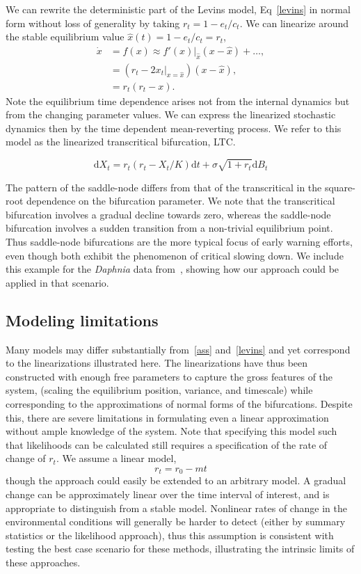 \documentclass[authoryear, preprint,review,12pt]{elsarticle}
\newcommand{\ud}{\mathrm{d}}
\begin{document}
We can rewrite the deterministic part of the Levins model, Eq~\ref{levins} in normal form without loss of generality by taking $r_t = 1 - e_t/c_t$.  
We can linearize around the stable equilibrium value $\hat x(t) = 1 - e_t/c_t = r_t$, 
\begin{align}
\dot x &=  f(x) \approx f'(x)|_{\hat x} (x - \hat x) + \ldots, \nonumber \\
 &= (r_t - 2 x_t|_{x=\hat x}) (x - \hat x), \nonumber\\
 &= r_t(r_t - x). \nonumber
\end{align}
Note the equilibrium time dependence arises not from the internal dynamics but from the changing parameter values.  We can express the linearized stochastic dynamics then by the time dependent mean-reverting process.  We refer to this model as the linearized transcritical bifurcation, LTC.  

\begin{equation}
\ud X_t = r_t (r_t - X_t/K) \ud t + \sigma \sqrt{1+r_t} \ud B_t \label{LTC}
\end{equation}

The pattern of the saddle-node differs from that of the transcritical in the square-root dependence on the bifurcation parameter.  We note that the transcritical bifurcation involves a gradual decline towards zero, whereas the saddle-node bifurcation involves a sudden transition from a non-trivial equilibrium point. Thus saddle-node bifurcations are the more typical focus of early warning efforts, even though both exhibit the phenomenon of critical slowing down.  We include this example for the \emph{Daphnia} data from~\citet{Drake2010}, showing how our approach could be applied in that scenario.  


\subsection{Modeling limitations}
Many models may differ substantially from~\eqref{ass} and~\eqref{levins} and yet correspond to the linearizations illustrated here.  
The linearizations have thus been constructed with enough free parameters to capture the gross features of the system,
(scaling the equilibrium position, variance, and timescale) while corresponding to the approximations of normal forms of the bifurcations.  
Despite this, there are severe limitations in formulating even a linear approximation without ample knowledge of the system. 
Note that specifying this model such that likelihoods can be calculated still requires a specification of the rate of change of $r_t$.
We assume a linear model,
\begin{equation}
r_t = r_0 - m t
\label{R_t}
\end{equation}
though the approach could easily be extended to an arbitrary model.
A gradual change can be approximately linear over the time interval of interest, and is appropriate to distinguish from a stable model.
Nonlinear rates of change in the environmental conditions will generally be harder to detect (either by summary statistics or the likelihood approach),
thus this assumption is consistent with testing the best case scenario for these methods, illustrating the intrinsic limits of these approaches.  
\end{document}
